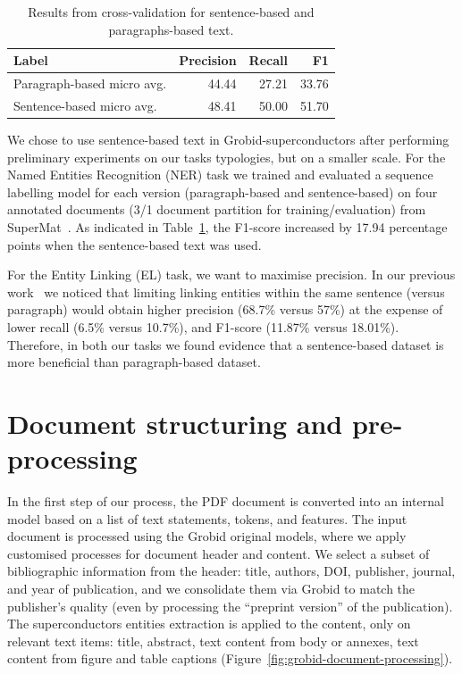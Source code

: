 \begin{table}[ht]
    \centering
    \caption{Results from cross-validation for sentence-based and paragraphs-based text.  }
    
    \begin{tabular}{lrrr}
        \toprule
        \textbf{Label}             & \textbf{Precision} & \textbf{Recall} & \textbf{F1} \\
        \midrule
        Paragraph-based micro avg. & 44.44              & 27.21           & 33.76       \\
        Sentence-based micro avg.  & 48.41              & 50.00           & 51.70       \\
        \bottomrule
    \end{tabular}

    \label{tab:comparison-evaluation-sentences-paragraphs}
\end{table}

We chose to use sentence-based text in Grobid-superconductors after performing preliminary experiments on our tasks typologies, but on a smaller scale. 
For the Named Entities Recognition (NER) task we trained and evaluated a sequence labelling model for each version (paragraph-based and sentence-based) on four annotated documents (3/1 document partition for training/evaluation) from SuperMat~\cite{foppiano2021supermat}.
As indicated in Table~\ref{tab:comparison-evaluation-sentences-paragraphs}, the F1-score increased by 17.94 percentage points when the sentence-based text was used.

For the Entity Linking (EL) task, we want to maximise precision. 
In our previous work~\cite{foppiano2019proposal} we noticed that limiting linking entities within the same sentence (versus paragraph) would obtain higher precision (68.7\% versus 57\%) at the expense of lower recall (6.5\% versus 10.7\%), and F1-score (11.87\% versus 18.01\%).
Therefore, in both our tasks we found evidence that a sentence-based dataset is more beneficial than paragraph-based dataset.


\section{Document structuring and pre-processing}
\label{subsubsec:document-structuring}
In the first step of our process, the PDF document is converted into an internal model based on a list of text statements, tokens, and features.
The input document is processed using the Grobid original models, where we apply customised processes for document header and content.
We select a subset of bibliographic information from the header: title, authors, DOI, publisher, journal, and year of publication, and we consolidate them via Grobid to match the publisher's quality (even by processing the ``preprint version'' of the publication).
The superconductors entities extraction is applied to the content, only on relevant text items: title, abstract, text content from body or annexes, text content from figure and table captions (Figure~\ref{fig:grobid-document-processing}).

